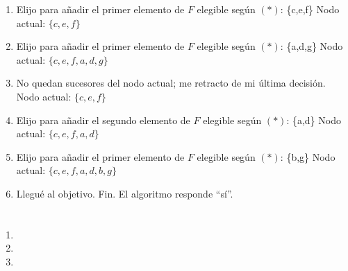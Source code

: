 \documentclass{article}
\begin{document}
\begin{enumerate}
\begin{enumerate}
\item Elijo para añadir el primer elemento de $F$ elegible según $(*)$: \{c,e,f\}
      Nodo actual: $\{c, e, f\}$

\item Elijo para añadir el primer elemento de $F$ elegible según $(*)$: \{a,d,g\}
      Nodo actual: $\{c,e,f,a,d,g\}$

\item No quedan sucesores del nodo actual; me retracto de mi última decisión.
      Nodo actual: $\{c, e, f\}$

\item Elijo para añadir el segundo elemento de $F$ elegible según $(*)$: \{a,d\}
      Nodo actual: $\{c, e, f, a, d\}$

\item Elijo para añadir el primer elemento de $F$ elegible según $(*)$: \{b,g\}
      Nodo actual: $\{c, e, f, a, d, b, g\}$

\item Llegué al objetivo. Fin. El algoritmo responde ``sí''.
\end{enumerate}

\end{enumerate}

\section{}

\begin{enumerate}
 \item 
 \item
 \item
\end{enumerate}

\section{}
\end{document}
